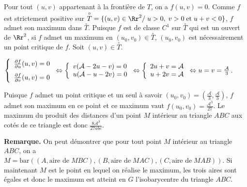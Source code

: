 {{Pour tout $(u,v)$ appartenant à la frontière de $T$, on a $f(u,v)=0$. Comme $f$ est strictement positive sur $\overset{\circ}{T}=\{(u,v)\in\Rr^2/\;u>0,\;v>0\;\text{et}\;u+v<0\}$, $f$ admet son maximum dans $\overset{\circ}{T}$. Puisque $f$ est de classe $C^1$ sur $\overset{\circ}{T}$ qui est un ouvert de $\Rr^2$, si $f$ admet un maximum en $(u_0,v_0)\in\overset{\circ}{T}$, $(u_0,v_0)$ est nécessairement un point critique de $f$. Soit $(u,v)\in\overset{\circ}{T}$.

\begin{center}
$\left\{
\begin{array}{l}
 \frac{\partial f}{\partial u}(u,v)=0\\
\rule{0mm}{6mm} \frac{\partial f}{\partial v}(u,v)=0
\end{array}
\right.\Leftrightarrow\left\{
\begin{array}{l}
v(\mathcal{A}-2u-v)=0\\
u(\mathcal{A}-u-2v)=0
\end{array}
\right.\Leftrightarrow\left\{
\begin{array}{l}
2u+v=\mathcal{A}\\
u+2v=\mathcal{A}
\end{array}
\right.\Leftrightarrow u=v= \frac{\mathcal{A}}{3}$.
\end{center}

Puisque $f$ admet un point critique et un seul à savoir $(u_0,v_0)=\left( \frac{\mathcal{A}}{3}, \frac{\mathcal{A}}{3}\right)$, $f$ admet son maximum en ce point et ce maximum vaut $f(u_0,v_0)= \frac{\mathcal{A}^3}{27}$. Le maximum du produit des distances d'un point $M$ intérieur au triangle $ABC$ aux cotés de ce triangle est donc $ \frac{8\mathcal{A}^3}{27abc}$.

\textbf{Remarque.} On peut démontrer que pour tout point $M$ intérieur au triangle $ABC$, on a $M=\text{bar}\left((A,\text{aire de}\;MBC),(B,\text{aire de}\;MAC),(C,\text{aire de}\;MAB)\right)$. Si maintenant $M$ est le point en lequel on réalise le maximum, les trois aires sont égales et donc le maximum est atteint en $G$ l'isobarycentre du triangle $ABC$.}
}